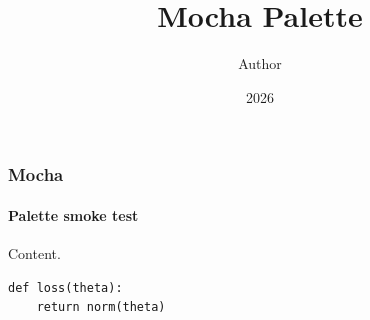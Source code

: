 \documentclass[notheorems,aspectratio=169]{beamer}
\title{Mocha Palette}
\author{Author}
\date{2026}
\begin{document}
\maketitle

\begin{frame}[fragile]
  \frametitle{Mocha}
  \framesubtitle{Palette smoke test}

  Content.

  \begin{verbatim}
def loss(theta):
    return norm(theta)
  \end{verbatim}
\end{frame}
\end{document}
